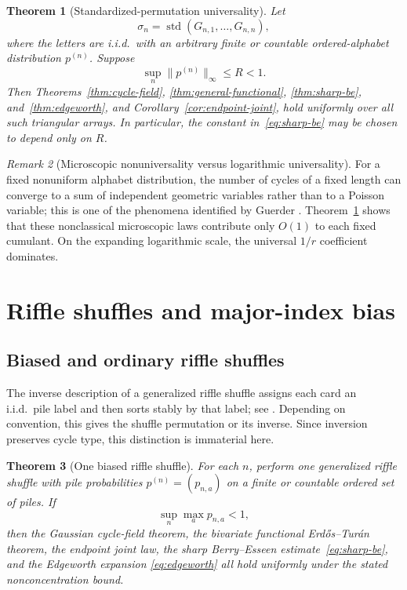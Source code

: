 \documentclass[11pt]{article}
\newtheorem{theorem}{Theorem}[section]
\theoremstyle{definition}
\theoremstyle{remark}
\newtheorem{remark}[theorem]{Remark}
\begin{document}
\begin{theorem}[Standardized-permutation universality]
\label{thm:standardized}
Let
\[
 \sigma_n=\operatorname{std}(G_{n,1},\ldots,G_{n,n}),
\]
where the letters are i.i.d.\ with an arbitrary finite or countable
ordered-alphabet distribution $p^{(n)}$.  Suppose
\[
 \sup_n\|p^{(n)}\|_\infty\le R<1.
\]
Then Theorems~\ref{thm:cycle-field},
\ref{thm:general-functional}, \ref{thm:sharp-be}, and~\ref{thm:edgeworth},
and Corollary~\ref{cor:endpoint-joint}, hold uniformly over all such
triangular arrays.  In particular, the constant in~\eqref{eq:sharp-be} may be chosen
to depend only on $R$.
\end{theorem}

\begin{remark}[Microscopic nonuniversality versus logarithmic universality]
For a fixed nonuniform alphabet distribution, the number of cycles of a
fixed length can converge to a sum of independent geometric variables
rather than to a Poisson variable; this is one of the phenomena identified
by Guerder \cite{Guerder2026}.  Theorem~\ref{thm:standardized} shows that
these nonclassical microscopic laws contribute only $O(1)$ to each fixed
cumulant.  On the expanding logarithmic scale, the universal $1/r$
coefficient dominates.
\end{remark}

\section{Riffle shuffles and major-index bias}

\subsection{Biased and ordinary riffle shuffles}

The inverse description of a generalized riffle shuffle assigns each card
an i.i.d.\ pile label and then sorts stably by that label; see
\cite{BayerDiaconis1992,Stanley2001}.  Depending on convention, this gives
the shuffle permutation or its inverse.  Since inversion preserves cycle
type, this distinction is immaterial here.

\begin{theorem}[One biased riffle shuffle]\label{thm:biased-riffle}
For each $n$, perform one generalized riffle shuffle with pile
probabilities $p^{(n)}=(p_{n,a})$ on a finite or countable ordered set of
piles.  If
\[
 \sup_n\max_a p_{n,a}<1,
\]
then the Gaussian cycle-field theorem, the bivariate functional
Erd\H{o}s--Tur\'an theorem, the endpoint joint law, the sharp
Berry--Esseen estimate~\eqref{eq:sharp-be}, and the Edgeworth expansion
\eqref{eq:edgeworth} all hold uniformly under the stated nonconcentration
bound.
\end{theorem}
\end{document}
